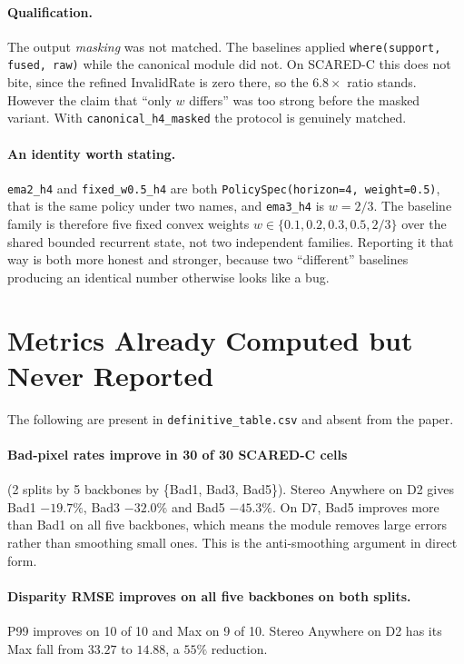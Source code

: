 \documentclass[11pt,a4paper]{article}
\begin{document}
\paragraph{Qualification.}
The output \emph{masking} was not matched. The baselines applied
\texttt{where(support, fused, raw)} while the canonical module did
not. On SCARED-C this does not bite, since the refined InvalidRate is
zero there, so the $6.8\times$ ratio stands. However the claim that
``only $w$ differs'' was too strong before the masked variant. With
\texttt{canonical\_h4\_masked} the protocol is genuinely matched.

\paragraph{An identity worth stating.}
\texttt{ema2\_h4} and \texttt{fixed\_w0.5\_h4} are both
\texttt{PolicySpec(horizon=4, weight=0.5)}, that is the same policy
under two names, and \texttt{ema3\_h4} is $w = 2/3$. The baseline
family is therefore five fixed convex weights
$w \in \{0.1, 0.2, 0.3, 0.5, 2/3\}$ over the shared bounded recurrent
state, not two independent families. Reporting it that way is both
more honest and stronger, because two ``different'' baselines
producing an identical number otherwise looks like a bug.

\section*{Metrics Already Computed but Never Reported}

The following are present in \texttt{definitive\_table.csv} and absent
from the paper.

\paragraph{Bad-pixel rates improve in 30 of 30 SCARED-C cells}
(2 splits by 5 backbones by \{Bad1, Bad3, Bad5\}). Stereo Anywhere on
D2 gives Bad1 $-19.7\%$, Bad3 $-32.0\%$ and Bad5 $-45.3\%$. On D7,
Bad5 improves more than Bad1 on all five backbones, which means the
module removes large errors rather than smoothing small ones. This is
the anti-smoothing argument in direct form.

\paragraph{Disparity RMSE improves on all five backbones on both
splits.} P99 improves on 10 of 10 and Max on 9 of 10. Stereo Anywhere
on D2 has its Max fall from $33.27$ to $14.88$, a $55\%$ reduction.
\end{document}
